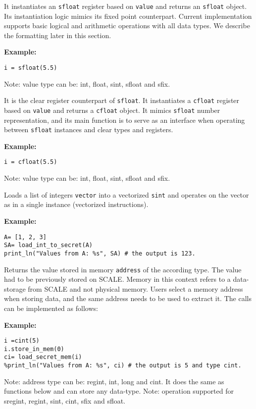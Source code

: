 It instantiates  an \verb|sfloat| register based on \verb|value| and returns an \verb|sfloat| object. 
Its instantiation logic mimics its fixed point counterpart. 
Current implementation supports basic logical and arithmetic operations with all data types.
We describe the formatting later in this section.

\noindent
\textbf{Example:}
\begin{lstlisting}
i = sfloat(5.5)
\end{lstlisting}
\begin{footnotesize}
Note: value type can be: int, float, sint, sfloat and sfix.
\end{footnotesize}

It is the clear register counterpart of \verb|sfloat|.
It instantiates a \verb|cfloat| register based on \verb|value| and returns a \verb|cfloat| object. 
It mimics \verb|sfloat| number representation, 
and its main function is to serve as an interface when operating 
between \verb|sfloat| instances and clear types and registers.

\noindent
\textbf{Example:}
\begin{lstlisting}
i = cfloat(5.5)
\end{lstlisting}
\begin{footnotesize}
Note: value type can be: int, float, sint, sfloat and sfix.
\end{footnotesize}

Loads a list of integers \verb|vector| into a vectorized \verb|sint| and operates on the vector as in a single instance (vectorized instructions).

\noindent
\textbf{Example:}
\begin{lstlisting}
A= [1, 2, 3]
SA= load_int_to_secret(A)
print_ln("Values from A: %s", SA) # the output is 123.
\end{lstlisting}

Returns the value stored in memory \verb|address| of the according type. The value had to be previously stored on SCALE. Memory in this context refers to a data-storage from SCALE and not physical memory. Users select a memory address when storing data, and the same address needs to be used to extract it. The calls can be implemented as follows: 

\noindent
\textbf{Example:}
\begin{lstlisting}
i =cint(5)
i.store_in_mem(0)
ci= load_secret_mem(i)
%print_ln("Values from A: %s", ci) # the output is 5 and type cint.
\end{lstlisting}
\begin{footnotesize}
Note: address type can be: regint, int, long and cint. It does the same as functions below and can store any data-type.
Note: operation supported for sregint, regint, sint, cint, sfix and sfloat.
\end{footnotesize}

